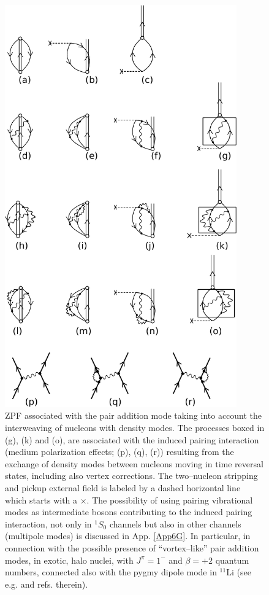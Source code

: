 \begin{figure}[h!]
\centerline {
\includegraphics*[width=10cm]{introduccion/figs/figintroA3}
}
\caption{ZPF associated with the pair addition mode taking into account the interweaving of nucleons with density modes. The processes boxed in (g), (k) and (o), are associated with the induced pairing interaction (medium polarization effects; (p), (q), (r)) resulting from the exchange of density modes between nucleons moving in time reversal states, including also vertex corrections. The two--nucleon stripping and pickup external field is labeled by a dashed horizontal line which starts with a $\times$. The possibility of using pairing vibrational modes as intermediate bosons contributing to the induced pairing interaction, not only in $^1S_0$ channels but also in other channels (multipole modes) is discussed in App. \ref{App6G}. In particular, in connection with the possible presence of ``vortex--like'' pair addition modes, in exotic, halo nuclei, with $J^\pi=1^-$ and $\beta=+2$ quantum numbers, connected also with the pygmy dipole mode in $^{11}$Li (see e.g. \cite{Broglia:19} and refs. therein).}
\label{figintroA3}
\end{figure}
\clearpage

